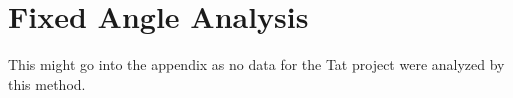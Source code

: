 \chapter{Fixed Angle Analysis}
This might go into the appendix as no data for the Tat project were analyzed by this method.